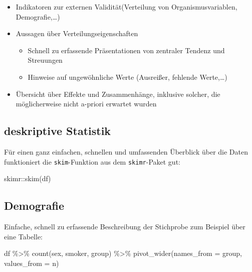 \documentclass[
]{book}
\newenvironment{Shaded}{\begin{snugshade}}{\end{snugshade}}
\newcommand{\AttributeTok}[1]{\textcolor[rgb]{0.77,0.63,0.00}{#1}}
\newcommand{\FunctionTok}[1]{\textcolor[rgb]{0.00,0.00,0.00}{#1}}
\newcommand{\NormalTok}[1]{#1}
\newcommand{\SpecialCharTok}[1]{\textcolor[rgb]{0.00,0.00,0.00}{#1}}
\providecommand{\tightlist}{%
  \setlength{\itemsep}{0pt}\setlength{\parskip}{0pt}}
\begin{document}
\begin{itemize}
\item
  Indikatoren zur externen Validität(Verteilung von Organismusvariablen, Demografie,\ldots)
\item
  Aussagen über Verteilungseigenschaften

  \begin{itemize}
  \tightlist
  \item
    Schnell zu erfassende Präsentationen von zentraler Tendenz und Streuungen
  \item
    Hinweise auf ungewöhnliche Werte (Ausreißer, fehlende Werte,\ldots)
  \end{itemize}
\item
  Übersicht über Effekte und Zusammenhänge, inklusive solcher, die möglicherweise nicht a-priori erwartet wurden
\end{itemize}

\hypertarget{deskriptive-statistik-1}{%
\subsection{deskriptive Statistik}\label{deskriptive-statistik-1}}

Für einen ganz einfachen, schnellen und umfassenden Überblick über die Daten funktioniert die \texttt{skim}-Funktion aus dem \texttt{skimr}-Paket gut:

\begin{Shaded}
\begin{Highlighting}[]
\NormalTok{skimr}\SpecialCharTok{::}\FunctionTok{skim}\NormalTok{(df)}
\end{Highlighting}
\end{Shaded}

\hypertarget{demografie}{%
\subsection{Demografie}\label{demografie}}

Einfache, schnell zu erfassende Beschreibung der Stichprobe zum Beispiel über eine Tabelle:

\begin{Shaded}
\begin{Highlighting}[]
\NormalTok{df }\SpecialCharTok{\%\textgreater{}\%} 
  \FunctionTok{count}\NormalTok{(sex, smoker, group) }\SpecialCharTok{\%\textgreater{}\%} 
  \FunctionTok{pivot\_wider}\NormalTok{(}\AttributeTok{names\_from =}\NormalTok{ group,}
              \AttributeTok{values\_from =}\NormalTok{ n)}
\end{Highlighting}
\end{Shaded}
\end{document}
